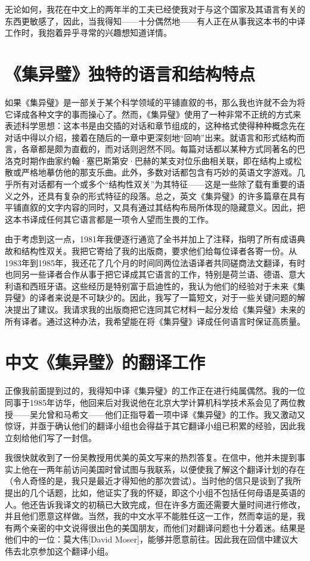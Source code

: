 无论如何，我花在中文上的两年半的工夫已经使我对于与这个国家及其语言有关的东西更敏感了，因此，当我得知——十分偶然地——有人正在从事我这本书的中译工作时，我抱着异乎寻常的兴趣想知道详情。

\section*{《集异璧》独特的语言和结构特点}

如果《集异璧》是一部关于某个科学领域的平铺直叙的书，那么我也许就不会为将它译成各种文字的事而操心了。然而，《集异璧》使用了一种非常不正统的方式来表述科学思想：这本书是由交插的对话和章节组成的，这种格式使得种种概念先在对话中得以介绍，接着在随后的一章中更深刻地“回响”出来。就语言和形式结构而言，各章都是颇为直截的，而对话则迥然不同。每篇对话都以某种方式同著名的巴洛克时期作曲家约翰·塞巴斯第安·巴赫的某支对位乐曲相关联，即在结构上或松散或严格地摹仿他的那支乐曲。此外，多数对话都包含有巧妙的英语文字游戏。几乎所有对话都有一个或多个“结构性双关”为其特征——这是一些除了载有重要的语义之外，还具有复杂的形式特征的段落。总之，英文《集异璧》的许多篇章在具有平铺直叙的文字内容的同时，又具有通过其结构布局所体现的隐藏意义。因此，把这本书译成任何其它语言都是一项令人望而生畏的工作。

由于考虑到这一点，1981年我便逐行通览了全书并加上了注释，指明了所有成语典故和结构性双关。我把它寄给了我的出版商，要求他们给每位译者各寄一份。从1983年到1985年，我还花了几个月的时间同两位法语译者共同磋商法文翻译，有时也同另一些译者合作从事于把它译成其它语言的工作，特别是荷兰语、德语、意大利语和西班牙语。这些经历是特别富于启迪性的，我认为他们的经验对于未来《集异璧》的译者来说是不可缺少的。因此，我写了一篇短文，对于一些关键问题的解决提出了建议。我请求我的出版商把它连同其它材料一起分发给《集异璧》未来的所有译者。通过这种办法，我希望能在将《集异璧》译成任何语言时保证高质量。

\section*{中文《集异璧》的翻译工作}

正像我前面提到过的，我得知中译《集异璧》的工作正在进行纯属偶然。我的一位同事于1985年访华，他回来后对我说他在北京大学计算机科学技术系会见了两位教授——吴允曾和马希文——他们正指导着一项中译《集异璧》的工作。我又激动又惊讶，并亟于确认他们的翻译小组也会得益于其它翻译小组已积累的经验，因此我立刻给他们写了一封信。

我很快就收到了一份吴教授用优美的英文写来的热烈答复。在信中，他并未提到事实上他在一两年前访问美国时曾试图与我联系，以便使我了解这个翻译计划的存在（令人奇怪的是，我只是最近才得知他的那次尝试）。当时他的信只是谈到了我所提出的几个话题，比如，他证实了我的怀疑，即这个小组不包括任何母语是英语的人。他还告诉我译文的初稿已大致完成，但在许多方面还需要大量时间进行修改，并且他们愿意这样做。当然，我的中文水平不能胜任这一工作，然而幸运的是，我有两个亲密的中文说得很出色的美国朋友，而他们对翻译问题也十分着迷。结果是他们中的一位：莫大伟[David Moser]，能够并愿意前往。因此我在回信中建议大伟去北京参加这个翻译小组。

